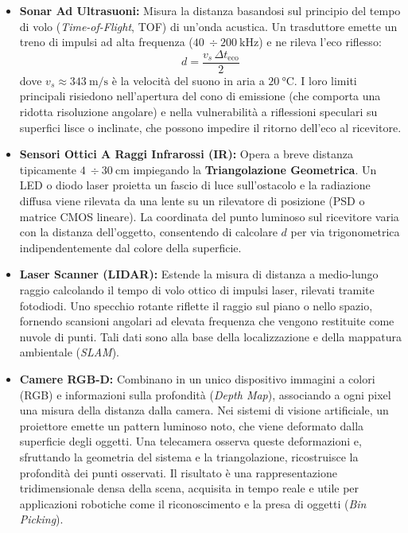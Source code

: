 ﻿\documentclass[11pt, a4paper]{article}
\begin{document}
\begin{itemize}
    \item \textbf{Sonar Ad Ultrasuoni:} Misura la distanza basandosi sul principio del tempo di volo (\textit{Time-of-Flight}, TOF) di un'onda acustica. Un trasduttore emette un treno di impulsi ad alta frequenza ($\SI{40}{}\div\SI{200}{\kilo\hertz}$) e ne rileva l'eco riflesso:
    \[
        d = \frac{v_s \, \Delta t_{\text{eco}}}{2}
    \]
    dove $v_s \approx \SI{343}{\meter\per\second}$ è la velocità del suono in aria a $\SI{20}{\celsius}$. I loro limiti principali risiedono nell'apertura del cono di emissione (che comporta una ridotta risoluzione angolare) e nella vulnerabilità a riflessioni speculari su superfici lisce o inclinate, che possono impedire il ritorno dell'eco al ricevitore.

    \item \textbf{Sensori Ottici A Raggi Infrarossi (IR):} Opera a breve distanza tipicamente $\SI{4}{}\div\SI{30}{\centi\meter}$ impiegando la \textbf{Triangolazione Geometrica}. Un LED o diodo laser proietta un fascio di luce sull'ostacolo e la radiazione diffusa viene rilevata da una lente su un rilevatore di posizione (PSD o matrice CMOS lineare). La coordinata del punto luminoso sul ricevitore varia con la distanza dell'oggetto, consentendo di calcolare $d$ per via trigonometrica indipendentemente dal colore della superficie.

    \item \textbf{Laser Scanner (LIDAR):} Estende la misura di distanza a medio-lungo raggio calcolando il tempo di volo ottico di impulsi laser, rilevati tramite fotodiodi. Uno specchio rotante riflette il raggio sul piano o nello spazio, fornendo scansioni angolari ad elevata frequenza che vengono restituite come nuvole di punti. Tali dati sono alla base della localizzazione e della mappatura ambientale (\textit{SLAM}).

     \item \textbf{Camere RGB-D:} Combinano in un unico dispositivo immagini a colori (RGB) e informazioni sulla profondità (\textit{Depth Map}), associando a ogni pixel una misura della distanza dalla camera. Nei sistemi di visione artificiale, un proiettore emette un pattern luminoso noto, che viene deformato dalla superficie degli oggetti. Una telecamera osserva queste deformazioni e, sfruttando la geometria del sistema e la triangolazione, ricostruisce la profondità dei punti osservati. Il risultato è una rappresentazione tridimensionale densa della scena, acquisita in tempo reale e utile per applicazioni robotiche come il riconoscimento e la presa di oggetti (\textit{Bin Picking}).
\end{itemize}
\end{document}
